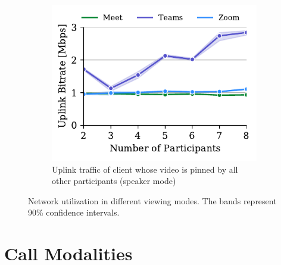 \begin{figure}[tb!]
\begin{subfigure}[t]{.33\textwidth}
    \label{fig:gallery-send}
\end{subfigure}
\hfill
\begin{subfigure}[t]{.33\textwidth}
  \centering
   \captionsetup{width=.9\linewidth}
    \includegraphics[width=1\textwidth,keepaspectratio]{../figures/modality/speaker_send.pdf}
    \caption{Uplink traffic of client whose video is pinned by all other participants (speaker mode)}
    \label{fig:speaker-send}
\end{subfigure}
\caption{Network utilization in different viewing modes. The bands represent 90\% confidence intervals.}
\label{fig:viewing-mode}
\end{figure}




\section{Call Modalities}\label{sec:usage_modality}

